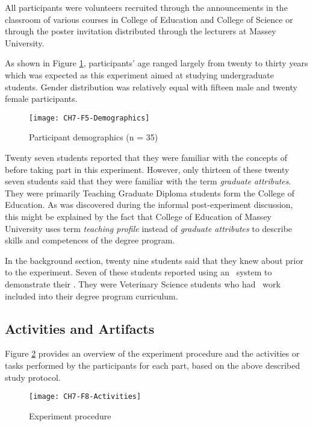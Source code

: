 All participants were volunteers recruited through the announcements in the
classroom of various courses in College of Education and College of Science or
through the poster invitation distributed through the lecturers at Massey
University.

As shown in Figure \ref{fig:demograph}, participants' age ranged largely from
twenty to thirty years which was expected as this experiment aimed at studying
undergraduate students. Gender distribution was relatively equal with fifteen
male and twenty female participants.

\begin{figure}[htb]
\centering
\texttt{[image: CH7-F5-Demographics]}
\caption{Participant demographics (n = 35)}
\label{fig:demograph}
\end{figure}

Twenty seven students reported that they were familiar with the concepts
of \LLLs before taking part in this experiment. However, only thirteen of these
twenty seven students said that they were familiar with the term
\textit{graduate attributes}. They were primarily Teaching Graduate Diploma
students form the College of Education. As was discovered during the informal
post-experiment discussion, this might be explained by the fact that College of
Education of Massey University uses term \textit{teaching profile} instead of
\textit{graduate attributes} to describe \LLLs skills and competences of the
degree program.

In the background section, twenty nine students said that they knew about
\textit{\ep} prior to the experiment. Seven of these students reported using an
\ep~system to demonstrate their \LLLsn. They were Veterinary Science students
who had \ep~work included into their degree program curriculum.

\subsection{Activities and Artifacts}

Figure \ref{fig:procedure} provides an overview of the experiment procedure and
the activities or tasks performed by the participants for each part, based on
the above described study protocol.

\begin{figure}[htb]
\centering
\texttt{[image: CH7-F8-Activities]}
\caption{Experiment procedure}
\label{fig:procedure}
\end{figure}

